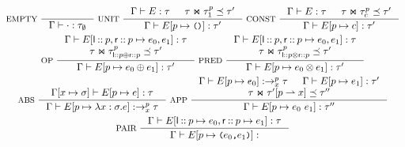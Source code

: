 \begin{figure}
  \centering
  \begin{gather*}
    \inference[ EMPTY ]{ }{
      \Gamma \judges \cdot : \tau_{\emptyset} } 
    \inference[ UNIT ]{
      \Gamma \judges E : \tau & %
      \tau \Join \tau_1^p \subtype \tau' }{ %
      \Gamma \judges \upd{ E }{ p }{ \unit } : \tau' } 
    \inference[ CONST ]{ %
      \Gamma \judges E : \tau &
      \tau \Join \tau_c^p \subtype \tau' }{ %
      \Gamma \judges \upd{ E }{ p }{ c } : %
      \tau' } \\
    \inference[ OP ]{ %
      \Gamma \judges %
      \upd{ E }{ \leftchild \cons p, \rightchild \cons p }{ %
        e_0, e_1 } : \tau \\
      \tau \Join \tau_{\leftchild \cons p \oplus \rightchild \cons
        p}^p \subtype \tau' }{ %
      \Gamma \judges \upd{ E }{ p }{ e_0 \oplus e_1 } : \tau' }
    \inference[ PRED ]{ %
      \Gamma \judges %
      \upd{ E }{ \leftchild \cons p, \rightchild \cons p }{ %
        e_0, e_1 } : \tau \\
      \tau \Join \tau_{\leftchild \cons p \otimes \rightchild \cons
        p}^p \subtype \tau' }{ %
      \Gamma \judges \upd{ E }{ p }{ e_0 \otimes e_1 } : \tau' } \\
    \inference[ ABS ]{ 
      \upd{ \Gamma }{ x }{ \sigma } \judges %
      \upd{ E }{ p }{ e } : \tau }{ %
      \Gamma \judges \upd{ E }{ p }{ \abs{ x }{ \sigma }{ e } } : %
      \to^p_x \tau } 
    \inference[ APP ]{ %
      \Gamma \judges \upd{E}{p}{e_0} : \to^p_x \tau &
      \Gamma \judges \upd{E}{p}{e_1} : \tau' \\
      \tau \Join \rename{ \tau' }{ p }{ x } \subtype \tau'' }{
      \Gamma \judges \upd{ E }{ p }{e_0\ e_1} : \tau'' } \\
    \inference[ PAIR ]{
      \Gamma \judges %
      E[ \leftchild \cons p \mapsto e_0, %
      \rightchild \cons p \mapsto e_1 ] : \tau }{
      \Gamma \judges \upd{E}{p}{ \pair{e_0}{e_1} } :
}
\end{gather*}
\end{figure}
